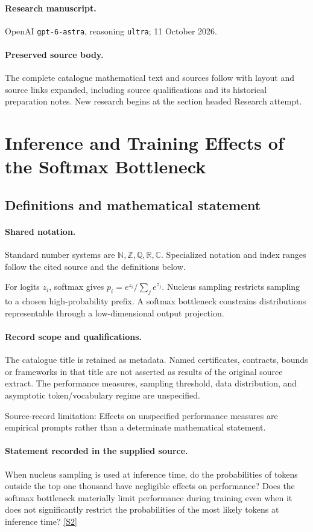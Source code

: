 \documentclass[11pt]{article}
\begin{document}
\paragraph{Research manuscript.} OpenAI \texttt{gpt-6-astra}, reasoning \texttt{ultra}; 11 October 2026.
\paragraph{Preserved source body.} The complete catalogue mathematical text and sources follow with layout and source links expanded, including source qualifications and its historical preparation notes. New research begins at the section headed Research attempt.

\section{Inference and Training Effects of the Softmax Bottleneck}\label{statement}

\subsection{Definitions and mathematical statement}

\paragraph{Shared notation.}Standard number systems are $\mathbb N,\mathbb Z,\mathbb Q,\mathbb R,\mathbb C$. Specialized notation and index ranges follow the cited source and the definitions below.


For logits $z_i$, softmax gives $p_i=e^{z_i}/\sum_j e^{z_j}$. Nucleus sampling restricts sampling to a chosen high-probability prefix. A softmax bottleneck constrains distributions representable through a low-dimensional output projection.
\paragraph{Record scope and qualifications.}
The catalogue title is retained as metadata. Named certificates, contracts, bounds or frameworks in that title are not asserted as results of the original source extract.
The performance measures, sampling threshold, data distribution, and asymptotic token/vocabulary regime are unspecified.

Source-record limitation: Effects on unspecified performance measures are empirical prompts rather than a determinate mathematical statement.
\paragraph{Statement recorded in the supplied source.}
When nucleus sampling is used at inference time, do the probabilities of tokens outside the top one thousand have negligible effects on performance? Does the softmax bottleneck materially limit performance during training even when it does not significantly restrict the probabilities of the most likely tokens at inference time? \href{https://doi.org/10.4171/owr/2026/11}{[S2]}
\end{document}
